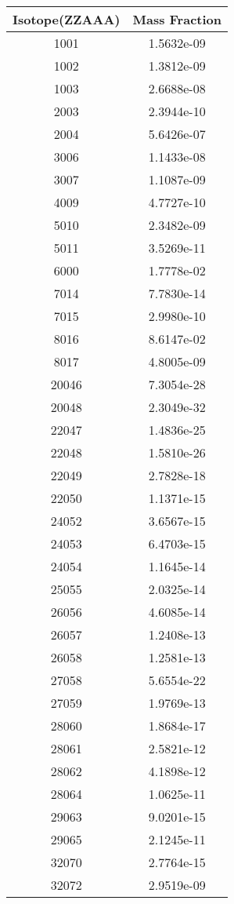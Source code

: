 \begin{table}[h!]
\centering
\begin{tabular}{|| c || c |}
\hline
Isotope(ZZAAA) & Mass Fraction \\
\hline \hline

1001 & 1.5632e-09 \\
1002 & 1.3812e-09 \\
1003 & 2.6688e-08 \\
2003 & 2.3944e-10 \\
2004 & 5.6426e-07 \\
3006 & 1.1433e-08 \\
3007 & 1.1087e-09 \\
4009 & 4.7727e-10 \\
5010 & 2.3482e-09 \\
5011 & 3.5269e-11 \\
6000 & 1.7778e-02 \\
7014 & 7.7830e-14 \\
7015 & 2.9980e-10 \\
8016 & 8.6147e-02 \\
8017 & 4.8005e-09 \\
20046 & 7.3054e-28 \\
20048 & 2.3049e-32 \\
22047 & 1.4836e-25 \\
22048 & 1.5810e-26 \\
22049 & 2.7828e-18 \\
22050 & 1.1371e-15 \\
24052 & 3.6567e-15 \\
24053 & 6.4703e-15 \\
24054 & 1.1645e-14 \\
25055 & 2.0325e-14 \\
26056 & 4.6085e-14 \\
26057 & 1.2408e-13 \\
26058 & 1.2581e-13 \\
27058 & 5.6554e-22 \\
27059 & 1.9769e-13 \\
28060 & 1.8684e-17 \\
28061 & 2.5821e-12 \\
28062 & 4.1898e-12 \\
28064 & 1.0625e-11 \\
29063 & 9.0201e-15 \\
29065 & 2.1245e-11 \\
32070 & 2.7764e-15 \\
32072 & 2.9519e-09 \\

\end{tabular}
\end{table}
